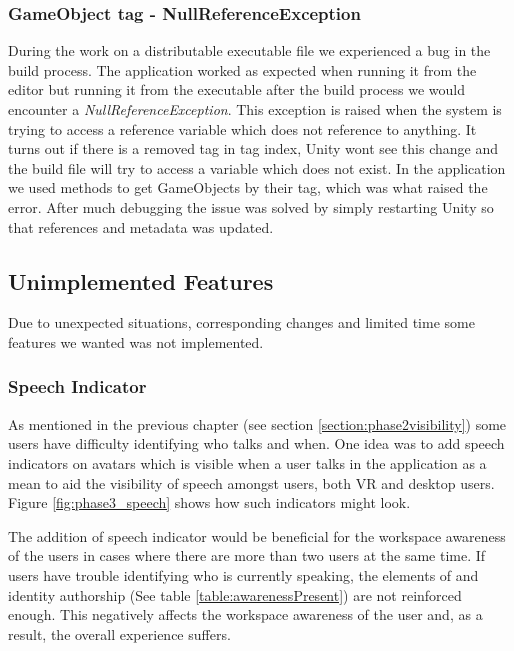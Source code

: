 \subsubsection{GameObject tag - NullReferenceException}
During the work on a distributable executable file we experienced a bug in the build process. The application worked as expected when running it from the editor but running it from the executable after the build process we would encounter a \textit{NullReferenceException}. This exception is raised when the system is trying to access a reference variable which does not reference to anything. It turns out if there is a removed tag in tag index, Unity wont see this change and the build file will try to access a variable which does not exist. In the application we used methods to get GameObjects by their tag, which was what raised the error. After much debugging the issue was solved by simply restarting Unity so that references and metadata was updated.  


\subsection{Unimplemented Features}
Due to unexpected situations, corresponding changes and limited time some features we wanted was not implemented. 

\subsubsection{Speech Indicator}
As mentioned in the previous chapter (see section \ref{section:phase2visibility}) some users have difficulty identifying who talks and when. One idea was to add speech indicators on avatars which is visible when a user talks in the application as a mean to aid the visibility of speech amongst users, both VR and desktop users. Figure \ref{fig:phase3_speech} shows how such indicators might look.

The addition of speech indicator would be beneficial for the workspace awareness of the users in cases where there are more than two users at the same time. If users have trouble identifying who is currently speaking, the elements of and identity authorship (See table \ref{table:awarenessPresent}) are not reinforced enough. This negatively affects the workspace awareness of the user and, as a result, the overall experience suffers.



